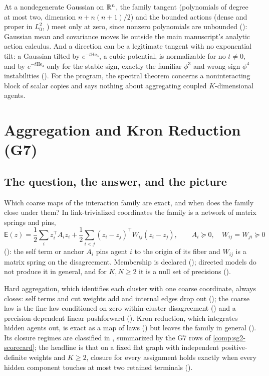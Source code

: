 At a nondegenerate Gaussian on \(\mathbb R^n\), the family tangent (polynomials of degree at most two, dimension
\(n+n(n+1)/2\)) and the bounded actions (dense and proper in \(L^2_0\), ) meet
only at zero, since nonzero polynomials are unbounded (): Gaussian mean and covariance
moves lie outside the main manuscript's analytic action calculus. And a direction can be a legitimate tangent
with no exponential tilt: a Gaussian tilted by \(e^{-t\mathrm{He}_3}\), a cubic potential, is normalizable for no
\(t\neq0\), and by \(e^{-t\mathrm{He}_4}\) only for the stable sign, exactly the familiar \(\phi^3\) and wrong-sign
\(\phi^4\) instabilities (). For the program, the spectral theorem concerns a
noninteracting block of scalar copies and says nothing about aggregating coupled \(K\)-dimensional agents.

\section{Aggregation and Kron Reduction (G7)}
\label{comp:sg2-coarse-maps}

\subsection{The question, the answer, and the picture}

Which coarse maps of the interaction family are exact, and when does the family close under them? In
link-trivialized coordinates the family is a network of matrix springs and pins,
\[
\mathsf E(z)=\frac12\sum_iz_i^\top A_iz_i+\frac12\sum_{i<j}(z_i-z_j)^\top W_{ij}(z_i-z_j),
\qquad A_i\succeq0,\quad W_{ij}=W_{ji}\succeq0
\]
(): the self term or anchor \(A_i\) pins agent \(i\) to the origin of its fiber
and \(W_{ij}\) is a matrix spring on the disagreement. Membership is declared ();
directed models do not produce it in general, and for \(K,N\geq2\) it is a null set of precisions
().

Hard aggregation, which identifies each cluster with one coarse coordinate, always closes: self terms and cut
weights add and internal edges drop out (); the coarse law is the fine law
conditioned on zero within-cluster disagreement () and a
precision-dependent linear pushforward (). Kron reduction, which integrates hidden
agents out, is exact as a map of laws () but leaves the family in general
(). Its closure regimes are classified in , summarized by
the G7 rows of \cref{comp:sg2-scorecard}; the headline is that on a fixed flat graph with independent
positive-definite weights and \(K\geq2\), closure for every assignment holds exactly when every hidden component
touches at most two retained terminals ().

